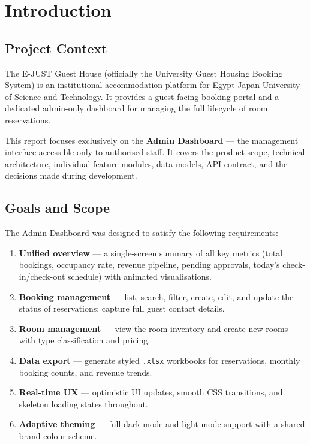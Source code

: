 \documentclass[12pt,a4paper]{report}
\begin{document}
\tableofcontents
\clearpage

\chapter{Introduction}

\section{Project Context}

The E-JUST Guest House (officially the University Guest Housing Booking System)
is an institutional accommodation platform for Egypt-Japan University of Science
and Technology. It provides a guest-facing booking portal and a dedicated
admin-only dashboard for managing the full lifecycle of room reservations.

This report focuses exclusively on the \textbf{Admin Dashboard} — the
management interface accessible only to authorised staff. It covers the
product scope, technical architecture, individual feature modules, data models,
API contract, and the decisions made during development.

\section{Goals and Scope}

The Admin Dashboard was designed to satisfy the following requirements:

\begin{enumerate}[leftmargin=2em]
  \item \textbf{Unified overview} — a single-screen summary of all key metrics
        (total bookings, occupancy rate, revenue pipeline, pending approvals,
        today's check-in/check-out schedule) with animated visualisations.
  \item \textbf{Booking management} — list, search, filter, create, edit, and
        update the status of reservations; capture full guest contact details.
  \item \textbf{Room management} — view the room inventory and create new rooms
        with type classification and pricing.
  \item \textbf{Data export} — generate styled \texttt{.xlsx} workbooks for
        reservations, monthly booking counts, and revenue trends.
  \item \textbf{Real-time UX} — optimistic UI updates, smooth CSS transitions,
        and skeleton loading states throughout.
  \item \textbf{Adaptive theming} — full dark-mode and light-mode support with
        a shared brand colour scheme.
\end{enumerate}
\end{document}
